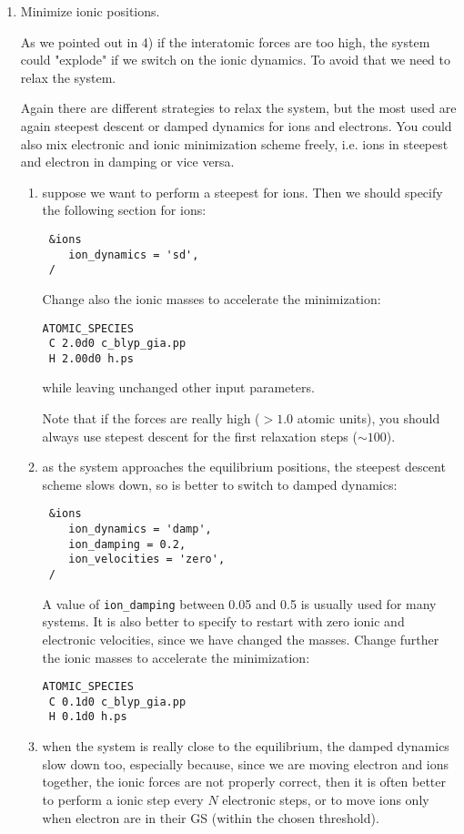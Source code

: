 \documentclass[12pt,a4paper]{article}
\begin{document}
\begin{enumerate}
  \item
    Minimize ionic positions.

    As we pointed out in 4) if the interatomic forces are too high,
    the system could "explode" if we switch on the ionic dynamics.
    To avoid that we need to relax the system. 

    Again there are different strategies to relax the system, but the
    most used are again steepest descent or damped dynamics for ions
    and electrons.
    You could also mix electronic and ionic minimization scheme
    freely, i.e. ions in steepest and electron in damping or vice
    versa.
   
    \begin{enumerate}
      \item
        suppose we want to perform a steepest for ions.
        Then we should specify the following section for ions:
\begin{verbatim}
 &ions
    ion_dynamics = 'sd',
 /
\end{verbatim}
        Change also the ionic masses to accelerate the minimization:
\begin{verbatim}
ATOMIC_SPECIES
 C 2.0d0 c_blyp_gia.pp
 H 2.00d0 h.ps
\end{verbatim}
        while leaving unchanged other input parameters.   

        Note that if the forces are really high ($> 1.0$ atomic
        units), you should always use stepest descent for the first
        relaxation steps ($\sim 100$).
   
      \item
        as the system approaches the equilibrium positions, the
        steepest descent scheme slows down, so is better to switch to
        damped dynamics:
\begin{verbatim}
 &ions
    ion_dynamics = 'damp',
    ion_damping = 0.2,
    ion_velocities = 'zero',
 /
\end{verbatim}
        A value of \texttt{ion\_damping} between 0.05 and 0.5 is
        usually used for many systems.
        It is also better to specify to restart with zero ionic and
        electronic velocities, since we have changed the masses.
        Change further the ionic masses to accelerate the
        minimization:
\begin{verbatim}
ATOMIC_SPECIES
 C 0.1d0 c_blyp_gia.pp
 H 0.1d0 h.ps
\end{verbatim}

      \item
        when the system is really close to the equilibrium, the damped
        dynamics slow down too, especially because, since we are
        moving electron and ions together, the ionic forces are not
        properly correct, then it is often better to perform a ionic
        step every $N$ electronic steps, or to move ions only when
        electron are in their GS (within the chosen threshold).


\end{enumerate}
\end{enumerate}
\end{document}
